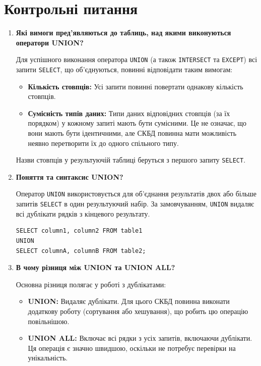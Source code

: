 \documentclass{article}
\begin{document}
    \section*{Контрольні питання}
    \begin{enumerate}[label=\arabic*., leftmargin=*]
        \item \textbf{Які вимоги пред’являються до таблиць, над якими виконуються оператори UNION?}
        
        Для успішного виконання оператора \texttt{UNION} (а також \texttt{INTERSECT} та \texttt{EXCEPT}) всі запити \texttt{SELECT}, що об'єднуються, повинні відповідати таким вимогам:
        \begin{itemize}
            \item \textbf{Кількість стовпців:} Усі запити повинні повертати однакову кількість стовпців.
            \item \textbf{Сумісність типів даних:} Типи даних відповідних стовпців (за їх порядком) у кожному запиті мають бути сумісними. Це не означає, що вони мають бути ідентичними, але СКБД повинна мати можливість неявно перетворити їх до одного спільного типу.
        \end{itemize}
        Назви стовпців у результуючій таблиці беруться з першого запиту \texttt{SELECT}.

        \item \textbf{Поняття та синтаксис UNION?}
        
        Оператор \texttt{UNION} використовується для об'єднання результатів двох або більше запитів \texttt{SELECT} в один результуючий набір. За замовчуванням, \texttt{UNION} видаляє всі дублікати рядків з кінцевого результату.
        \begin{CodeBox}
        \begin{verbatim}
SELECT column1, column2 FROM table1
UNION
SELECT columnA, columnB FROM table2;
        \end{verbatim}
        \end{CodeBox}
        
        \item \textbf{В чому різниця між UNION та UNION ALL?}
        
        Основна різниця полягає у роботі з дублікатами:
        \begin{itemize}
            \item \textbf{UNION:} Видаляє дублікати. Для цього СКБД повинна виконати додаткову роботу (сортування або хешування), що робить цю операцію повільнішою.
            \item \textbf{UNION ALL:} Включає всі рядки з усіх запитів, включаючи дублікати. Ця операція є значно швидшою, оскільки не потребує перевірки на унікальність.
        \end{itemize}


\end{enumerate}
\end{document}
